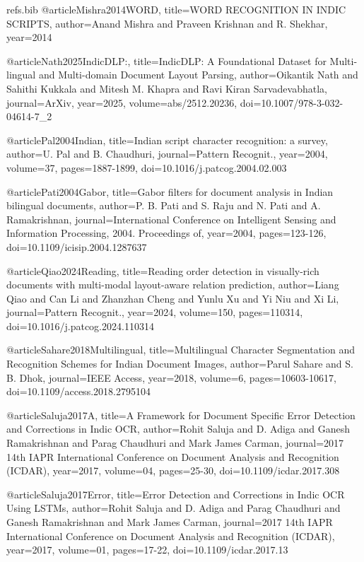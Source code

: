 \begin{filecontents}{refs.bib}
    @article{Mishra2014WORD,
    title={WORD RECOGNITION IN INDIC SCRIPTS},
    author={Anand Mishra and Praveen Krishnan and R. Shekhar},
    year={2014}
    }
    
    @article{Nath2025IndicDLP:,
    title={IndicDLP: A Foundational Dataset for Multi-lingual and Multi-domain Document Layout Parsing},
    author={Oikantik Nath and Sahithi Kukkala and Mitesh M. Khapra and Ravi Kiran Sarvadevabhatla},
    journal={ArXiv},
    year={2025},
    volume={abs/2512.20236},
    doi={10.1007/978-3-032-04614-7_2}
    }
    
    @article{Pal2004Indian,
    title={Indian script character recognition: a survey},
    author={U. Pal and B. Chaudhuri},
    journal={Pattern Recognit.},
    year={2004},
    volume={37},
    pages={1887-1899},
    doi={10.1016/j.patcog.2004.02.003}
    }
    
    @article{Pati2004Gabor,
    title={Gabor filters for document analysis in Indian bilingual documents},
    author={P. B. Pati and S. Raju and N. Pati and A. Ramakrishnan},
    journal={International Conference on Intelligent Sensing and Information Processing, 2004. Proceedings of},
    year={2004},
    pages={123-126},
    doi={10.1109/icisip.2004.1287637}
    }
    
    @article{Qiao2024Reading,
    title={Reading order detection in visually-rich documents with multi-modal layout-aware relation prediction},
    author={Liang Qiao and Can Li and Zhanzhan Cheng and Yunlu Xu and Yi Niu and Xi Li},
    journal={Pattern Recognit.},
    year={2024},
    volume={150},
    pages={110314},
    doi={10.1016/j.patcog.2024.110314}
    }
    
    @article{Sahare2018Multilingual,
    title={Multilingual Character Segmentation and Recognition Schemes for Indian Document Images},
    author={Parul Sahare and S. B. Dhok},
    journal={IEEE Access},
    year={2018},
    volume={6},
    pages={10603-10617},
    doi={10.1109/access.2018.2795104}
    }
    
    @article{Saluja2017A,
    title={A Framework for Document Specific Error Detection and Corrections in Indic OCR},
    author={Rohit Saluja and D. Adiga and Ganesh Ramakrishnan and Parag Chaudhuri and Mark James Carman},
    journal={2017 14th IAPR International Conference on Document Analysis and Recognition (ICDAR)},
    year={2017},
    volume={04},
    pages={25-30},
    doi={10.1109/icdar.2017.308}
    }
    
    @article{Saluja2017Error,
    title={Error Detection and Corrections in Indic OCR Using LSTMs},
    author={Rohit Saluja and D. Adiga and Parag Chaudhuri and Ganesh Ramakrishnan and Mark James Carman},
    journal={2017 14th IAPR International Conference on Document Analysis and Recognition (ICDAR)},
    year={2017},
    volume={01},
    pages={17-22},
    doi={10.1109/icdar.2017.13}
    }
    

\end{filecontents}
